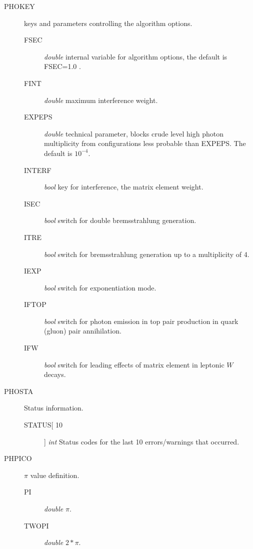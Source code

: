 \documentclass[]{Photos_interface_design}
\begin{document}
\begin{description}
\item[PHOKEY] keys and parameters controlling the algorithm options.
    \begin{description}
	\item[FSEC]   \textit{double} internal variable for algorithm options, the default is FSEC=1.0\; .
	\item[FINT]   \textit{double} maximum interference weight.
	\item[EXPEPS] \textit{double} technical parameter, blocks crude level high photon multiplicity from configurations less probable than EXPEPS. The default is $10^{-4}$.
	\item[INTERF] \textit{bool} key for interference, the matrix element weight.
	\item[ISEC]   \textit{bool} switch for double bremsstrahlung generation.
	\item[ITRE]   \textit{bool} switch for bremsstrahlung generation up to a multiplicity of 4.
	\item[IEXP]   \textit{bool} switch for exponentiation mode.
	\item[IFTOP]  \textit{bool} switch for photon emission in top pair production in quark (gluon) pair annihilation.
	\item[IFW]    \textit{bool} switch for leading effects of matrix element in leptonic $W$ decays.
    \end{description}
\end{description}

\begin{description}
\item[PHOSTA] Status information.
    \begin{description}
    \item[STATUS[ 10]]  \textit{int} Status codes for the last 10 errors/warnings
    that occurred.
    \end{description}
\end{description}

\begin{description}
\item[PHPICO] $\pi$ value definition.
    \begin{description}
    \item[PI]  \textit{double} $\pi$.
	\item[TWOPI]  \textit{double} $2*\pi$.
    \end{description}
\end{description}
\end{document}
